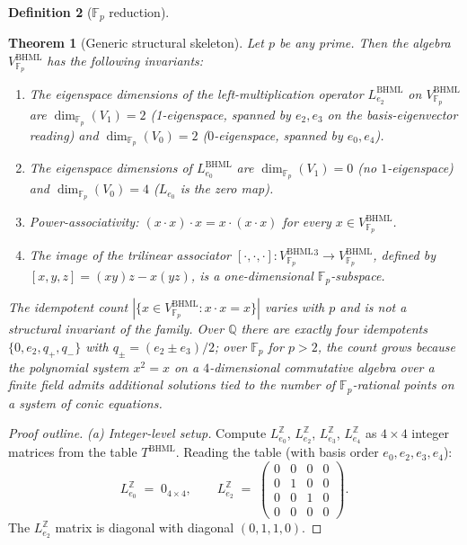 \documentclass[11pt,reqno]{amsart}
\theoremstyle{plain}
\newtheorem{theorem}{Theorem}[section]
\theoremstyle{definition}
\newtheorem{definition}[theorem]{Definition}
\theoremstyle{remark}
\newcommand{\Z}{\mathbb{Z}}
\newcommand{\F}{\mathbb{F}}
\newcommand{\BHML}{\mathrm{BHML}}
\begin{document}
\begin{definition}[$\F_{p}$ reduction]
\begin{theorem}[Generic structural skeleton]
\label{thm:universality}
Let $p$ be any prime. Then the algebra
$V^{\BHML}_{\F_{p}}$ has the following invariants:
\begin{enumerate}
\item The eigenspace dimensions of the left-multiplication operator
$L_{e_{2}}^{\BHML}$ on $V^{\BHML}_{\F_{p}}$ are
$\dim_{\F_{p}}(V_{1}) = 2$ (1-eigenspace, spanned by $e_{2}, e_{3}$
on the basis-eigenvector reading) and $\dim_{\F_{p}}(V_{0}) = 2$
($0$-eigenspace, spanned by $e_{0}, e_{4}$).
\item The eigenspace dimensions of $L_{e_{0}}^{\BHML}$ are
$\dim_{\F_{p}}(V_{1}) = 0$ (no $1$-eigenspace) and
$\dim_{\F_{p}}(V_{0}) = 4$ ($L_{e_{0}}$ is the zero map).
\item Power-associativity: $(x \cdot x) \cdot x = x \cdot (x \cdot
x)$ for every $x \in V^{\BHML}_{\F_{p}}$.
\item The image of the trilinear associator
$[\cdot, \cdot, \cdot] : V^{\BHML}_{\F_{p}}{}^{3} \to V^{\BHML}_{\F_{p}}$,
defined by $[x, y, z] = (x y) z - x (y z)$, is a one-dimensional
$\F_{p}$-subspace.
\end{enumerate}
The idempotent count $|\{x \in V^{\BHML}_{\F_{p}} : x \cdot x = x\}|$
varies with $p$ and is not a structural invariant of the family. Over
$\mathbb{Q}$ there are exactly four idempotents
$\{0, e_{2}, q_{+}, q_{-}\}$ with $q_{\pm} = (e_{2} \pm e_{3})/2$;
over $\F_{p}$ for $p > 2$, the count grows because the polynomial
system $x^{2} = x$ on a $4$-dimensional commutative algebra over a
finite field admits additional solutions tied to the number of
$\F_{p}$-rational points on a system of conic equations.
\end{theorem}

\begin{proof}[Proof outline]
\textit{(a) Integer-level setup.} Compute $L_{e_{0}}^{\Z}$,
$L_{e_{2}}^{\Z}$, $L_{e_{3}}^{\Z}$, $L_{e_{4}}^{\Z}$ as $4 \times 4$
integer matrices from the table $T^{\BHML}$. Reading the table (with
basis order $e_{0}, e_{2}, e_{3}, e_{4}$):
\[
L_{e_{0}}^{\Z} \;=\; 0_{4\times 4}, \qquad
L_{e_{2}}^{\Z} \;=\;
\begin{pmatrix}
0 & 0 & 0 & 0 \\
0 & 1 & 0 & 0 \\
0 & 0 & 1 & 0 \\
0 & 0 & 0 & 0
\end{pmatrix}.
\]
The $L_{e_{2}}^{\Z}$ matrix is diagonal with diagonal $(0, 1, 1, 0)$.


\end{proof}
\end{definition}
\end{document}
